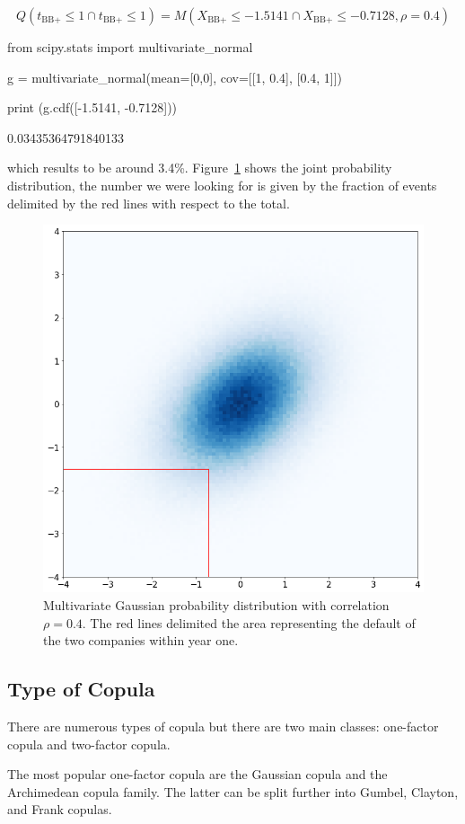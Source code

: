 \begin{equation*}
Q(t_{\textrm{BB+}}\leq 1 \cap t_{\textrm{BB+}}\leq 1) = M(X_{\textrm{BB+}}\leq -1.5141 \cap X_{\textrm{BB+}}\leq -0.7128, \rho=0.4)
\end{equation*}

\begin{ipython}
from scipy.stats import multivariate_normal

g = multivariate_normal(mean=[0,0],
                        cov=[[1, 0.4],
                             [0.4, 1]])

print (g.cdf([-1.5141, -0.7128]))
\end{ipython}
\begin{ioutput}
0.03435364791840133
\end{ioutput}
\noindent
which results to be around 3.4\%. Figure~\ref{fig:copula_no_marginals} shows the joint probability distribution, the number we were looking for is given by the fraction of events delimited by the red lines with respect to the total.

\begin{figure}[htbp]
\centering
\includegraphics[width=0.5\linewidth]{figures/copula_no_marginals}
\caption{Multivariate Gaussian probability distribution with correlation $\rho=0.4$. The red lines delimited the area representing the default of the two companies within year one.}
\label{fig:copula_no_marginals}
\end{figure}

\subsection{Type of Copula}
There are numerous types of copula but there are two main classes: one-factor copula and two-factor copula.

The most popular one-factor copula are the Gaussian copula and the Archimedean copula family. The latter can be split further into Gumbel, Clayton, and Frank copulas.

